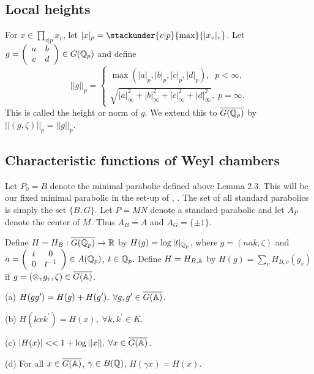 \subsection{Local heights}

For $x\in \prod_{v|p}x_v$, let $|x|_p=\stackunder{v|p}{\max }\{|x_v|_v\}$.
Let $g=\left( 
\begin{array}{cc}
a & b \\ 
c & d
\end{array}
\right) \in G({\Bbb{Q}}_p)$ and define 
\[
||g||_p=\left\{ 
\begin{array}{c}
\max (|a|_p,|b|_p,|c|_p,|d|_p),\;\;p<\infty , \\ 
\sqrt{|a|_\infty ^2+|b|_\infty ^2+|c|_\infty ^2+|d|_\infty ^2},\;p=\infty .
\end{array}
\right. 
\]
This is called the height or norm of $g$. We extend this to
$\overline{G({{\Bbb{Q}}}_p)}$ by $||(g,\zeta)||_p=||g||_p$.

\subsection{Characteristic functions of Weyl chambers}

Let $P_0=B$ denote the minimal parabolic defined above Lemma 2.3.
This will be our fixed
minimal parabolic in the set-up of \cite{A2}, \cite{A3}.
The set of all standard
parabolics is simply the set $\{B,G\}$. Let $P=MN$ denote a standard
parabolic and let $A_P$ denote the center of $M$. Thus $A_B=A$ and
$A_G=\{\pm 1\}$.

Define $H=H_B:\overline{G({\Bbb{Q}}_p)}\rightarrow \Bbb{R}$
by $H(g)=\log |t|_{{\Bbb{Q}}_p}$, where $g=(nak,\zeta)$ and
$a=\left( 
\begin{array}{cc}
t & 0 \\ 
0 & t^{-1}
\end{array}
\right) \in A({\Bbb{Q}}_p)$, $t\in {\Bbb{Q}}_p$.
Define $H=H_{B,{\Bbb{A}}}$ by
$H(g)=\sum_v H_{B,v}(g_v)$ if
$g=(\otimes_v g_v,\zeta)\in \overline{G({\Bbb{A}})}$.

\begin{lemma}
(a) $H(gg^{\prime })=H(g)+H(g^{\prime }),
\;\forall g,g^{\prime }\in \overline{G({\Bbb{A}})}$.

(b) $H(kxk^{\prime })=H(x),\;\forall k,k^{\prime }\in K$.

(c) $|H(x)|<<1+\log ||x||,\;\forall x\in \overline{G({\Bbb{A}})}$.

(d) For all $x\in \overline{G({\Bbb{A}})}$,
$\gamma \in B({\Bbb{Q}})$, $H(\gamma x)=H(x)$.
\end{lemma}

